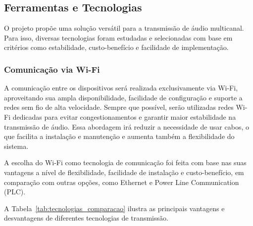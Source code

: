 \documentclass{article}
\begin{document}
\newpage

\subsection{Ferramentas e Tecnologias}


O projeto propõe uma solução versátil para a transmissão de áudio multicanal. Para isso, diversas tecnologias foram estudadas e selecionadas com base em critérios como estabilidade, custo-benefício e facilidade de implementação.

\subsubsection{Comunicação via Wi-Fi}
A comunicação entre os dispositivos será realizada exclusivamente via Wi-Fi, aproveitando sua ampla disponibilidade, facilidade de configuração e suporte a redes sem fio de alta velocidade. Sempre que possível, serão utilizadas redes Wi-Fi dedicadas para evitar congestionamentos e garantir maior estabilidade na transmissão de áudio. Essa abordagem irá reduzir a necessidade de usar cabos, o que facilita a instalação e manutenção e aumenta também a flexibilidade do sistema.

A escolha do Wi-Fi como tecnologia de comunicação foi feita com base nas suas vantagens a nível de flexibilidade, facilidade de instalação e custo-benefício, em comparação com outras opções, como Ethernet e Power Line Communication (PLC).

A Tabela~\ref{tab:tecnologias_comparacao} ilustra as principais vantagens e desvantagens de diferentes tecnologias de transmissão.
\end{document}
